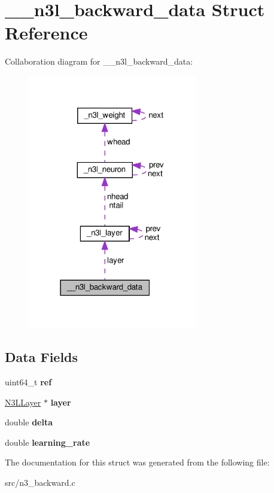 \hypertarget{struct____n3l__backward__data}{}\section{\+\_\+\+\_\+n3l\+\_\+backward\+\_\+data Struct Reference}
\label{struct____n3l__backward__data}


Collaboration diagram for \+\_\+\+\_\+n3l\+\_\+backward\+\_\+data\+:\nopagebreak
\begin{figure}[H]
\begin{center}
\leavevmode
\includegraphics[width=210pt]{struct____n3l__backward__data__coll__graph}
\end{center}
\end{figure}
\subsection*{Data Fields}
\begin{DoxyCompactItemize}
\item 
\mbox{\label{struct____n3l__backward__data_a32ef8a9b7e79121a563b8cd5486f88d3}} 
uint64\+\_\+t {\bfseries ref}
\item 
\mbox{\label{struct____n3l__backward__data_a0dcc17f32256df3e7ec65046236ffd24}} 
\mbox{\hyperlink{struct__n3l__layer}{N3\+L\+Layer}} $\ast$ {\bfseries layer}
\item 
\mbox{\label{struct____n3l__backward__data_ab41bb2c143496d239fe41b208809cc85}} 
double {\bfseries delta}
\item 
\mbox{\label{struct____n3l__backward__data_aa29c1bf7dcb85bfaaa0ec9b01cecc425}} 
double {\bfseries learning\+\_\+rate}
\end{DoxyCompactItemize}


The documentation for this struct was generated from the following file\+:\begin{DoxyCompactItemize}
\item 
src/n3\+\_\+backward.\+c\end{DoxyCompactItemize}
